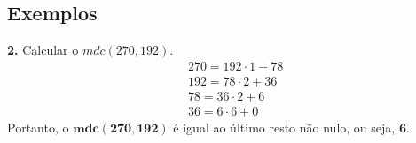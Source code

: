 \subsection*{Exemplos}
\textbf{2.} Calcular o $mdc(270, 192)$.
\begin{align}
     & 270 = 192 \cdot 1 + 78 \\
     & 192 = 78 \cdot 2 + 36  \\
     & 78 = 36 \cdot 2 + 6    \\
     & 36 = 6 \cdot 6 + 0
\end{align}
Portanto, o $\mathbf{mdc(270,192)}$ é igual ao último resto não nulo, ou seja, $\mathbf{6}$.